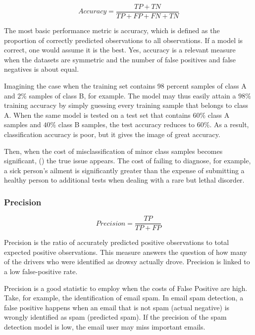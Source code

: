 \begin{equation}
    Accuracy = \frac{TP+TN}{TP+FP+FN+TN}
\end{equation}

The most basic performance metric is accuracy, which is defined as the proportion of correctly predicted observations to all observations. If a model is correct, one would assume it is the best. Yes, accuracy is a relevant measure when the datasets are symmetric and the number of false positives and false negatives is about equal.

Imagining the case when the training set contains 98 percent samples of class A and $2\%$ samples of class B, for example. The model may thus easily attain a $98\%$ training accuracy by simply guessing every training sample that belongs to class A. When the same model is tested on a test set that contains $60\%$ class A samples and $40\%$ class B samples, the test accuracy reduces to $60\%$. As a result, classification accuracy is poor, but it gives the image of great accuracy.

Then, when the cost of misclassification of minor class samples becomes significant, (\cite{metrics1}) the true issue appears. The cost of failing to diagnose, for example, a sick person's ailment is significantly greater than the expense of submitting a healthy person to additional tests when dealing with a rare but lethal disorder.

\subsubsection{Precision} \label{4precision}
\begin{equation}
    Precision = \frac{TP}{TP+FP}
\end{equation}

Precision \cite{metrics2} is the ratio of accurately predicted positive observations to total expected positive observations. This measure answers the question of how many of the drivers who were identified as drowsy actually drove. Precision is linked to a low false-positive rate.

Precision is a good statistic to employ when the costs of False Positive are high. Take, for example, the identification of email spam. In email spam detection, a false positive happens when an email that is not spam (actual negative) is wrongly identified as spam (predicted spam). If the precision of the spam detection model is low, the email user may miss important emails.

